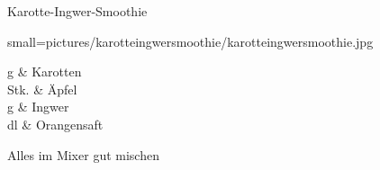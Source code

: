 \begin{recipe}
	[
	preparationtime = {\unit[5]{min}},
	bakingtime,
	bakingtemperature,
	portion = {\portion{2}},
	calory,
	source
	]
	{Karotte-Ingwer-Smoothie}
	
	\graph
	{
		small=pictures/karotteingwersmoothie/karotteingwersmoothie.jpg
	}
	
	\ingredients
	{
		\unit[200]{g} & Karotten \\
		\unit[2]{Stk.} & Äpfel \\
		\unit[4-6]{g} & Ingwer \\
		\unit[3]{dl} & Orangensaft
	}
	
	\preparation
	{
		\step Alles im Mixer gut mischen
	}
	
\end{recipe}